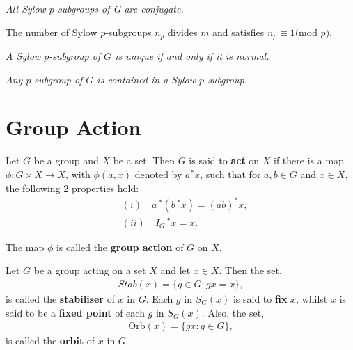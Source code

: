 \begin{theorem}
\label{Sylow.equiv.proof_1}
\textit{All Sylow $p$-subgroups of G are conjugate.} \\
\end{theorem}

\begin{theorem}
    \label{card_sylow_modEq_one}
The number of Sylow $p$-subgroups $n_p$ divides $m$ and satisfies $n_p \equiv 1 ($mod $p)$. \\
\end{theorem}

\begin{corollary}
\label{Sylow.unique_of_normal}
 \textit{A Sylow $p$-subgroup of $G$ is unique if and only if it is normal.} \\
\end{corollary}

\begin{corollary}
\label{IsPGroup.exists_le_sylow}
\textit{Any $p$-subgroup of $G$ is contained in a Sylow $p$-subgroup.} \\
\end{corollary}

\section{Group Action}

\begin{definition} Let $G$ be a group and $X$ be a set. Then $G$ is said to \textbf{act} on $X$ if there is a map $\phi : G \times X \rightarrow X$, with $\phi(a,x)$ denoted by $a^*x$, such that for $a,b \in G$ and $x \in X$, the following 2 properties hold:
\begin{align*} &(i) \quad a\,^*(b\,^*x) = (ab)^*x,
\\  &(ii) \quad I_G\,^*x = x.
\end{align*}

The map $\phi$ is called the \textbf{group action} of $G$ on $X$.
\end{definition}

\begin{definition} Let $G$ be a group acting on a set $X$ and let $x \in X$. Then the set,
\begin{align*} Stab(x) = \{ g \in G  :  gx = x \},
\end{align*}
is called the \textbf{stabiliser} of $x$ in $G$. Each $g$ in $S_G(x)$ is said to \textbf{fix} $x$, whilst $x$ is said to be a \textbf{fixed point} of each $g$ in $S_G(x)$. Also, the set,
\begin{align*} \text{Orb}(x) = \{ gx : g \in G \},
\end{align*}
is called the \textbf{orbit} of $x$ in $G$.  
\end{definition} 

